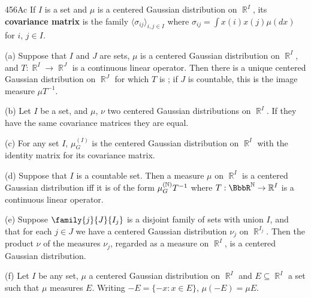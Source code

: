 \spheader 456Ac If $I$ is a set and $\mu$ is a centered Gaussian
distribution on $\BbbR^I$, its {\bf covariance matrix} is the
family $\langle\sigma_{ij}\rangle_{i,j\in I}$ where
$\sigma_{ij}=\int x(i)x(j)\mu(dx)$ for $i$, $j\in I$.   

 (a) Suppose that $I$ and $J$ are sets, $\mu$
is a centered Gaussian distribution on $\BbbR^I$, and
$T:\BbbR^I\to\BbbR^J$ is a continuous linear operator.   Then there is a
unique centered Gaussian distribution on $\BbbR^J$ for which $T$ is
\imp;  if $J$ is countable, this is the image measure $\mu T^{-1}$.

(b) Let $I$ be a set, and $\mu$, $\nu$ two centered Gaussian
distributions on $\BbbR^I$.   If they have the same covariance matrices
they are equal.

(c) For any set $I$, $\mu_G^{(I)}$ is the centered Gaussian distribution
on $\BbbR^I$ with the identity matrix for its covariance matrix.

(d) Suppose that $I$ is a countable set.   Then a measure $\mu$ on
$\BbbR^I$ is a centered Gaussian distribution iff it is of the form
$\mu_G^{(\Bbb N)}T^{-1}$ where $T:\BbbR^{\Bbb N}\to\Bbb R^I$ is a
continuous linear operator.

(e) Suppose $\family{j}{J}{I_j}$ is a disjoint family of sets with union
$I$, and that for each $j\in J$ we have a centered Gaussian distribution
$\nu_j$ on $\BbbR^{I_j}$.   Then the product $\nu$ of the measures
$\nu_j$, regarded as a measure on $\BbbR^I$, is a centered Gaussian
distribution.

(f) Let $I$ be any set, $\mu$ a centered Gaussian distribution on
$\BbbR^I$ and $E\subseteq\BbbR^I$ a set such that $\mu$ measures $E$.
Writing $-E=\{-x:x\in E\}$, $\mu(-E)=\mu E$.

